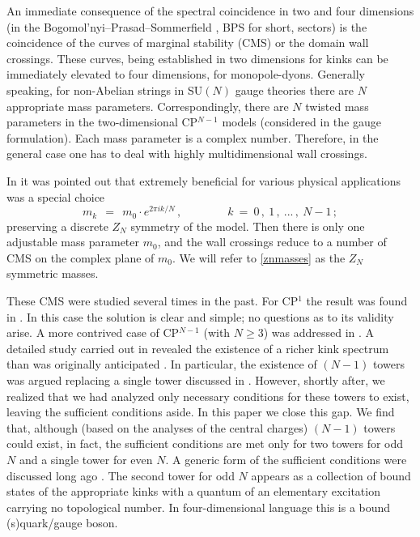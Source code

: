 \documentclass[epsfig,12pt]{article}
\def\beq{\begin{equation}}
\def\eeq{\end{equation}}
\def\beq{\begin{equation}}
\def\eeq{\end{equation}}
\begin{document}
	An immediate consequence of the spectral coincidence in two and four dimensions 
	(in the Bogomol'nyi--Prasad--Sommerfield 
\cite{BPS}, 
	BPS for short, sectors) 
	is the coincidence of the curves of marginal stability (CMS) or the domain wall crossings.
	These curves, being established in two dimensions for kinks can be immediately elevated to four dimensions, for monopole-dyons. 
	Generally speaking, for non-Abelian strings in SU$(N)$ gauge theories there are $N$ appropriate mass parameters.
	Correspondingly, there are $N$ twisted mass parameters in the two-dimensional CP$^{N-1}$ models (considered in the gauge formulation). 
	Each mass parameter is a complex number. 
	Therefore, in the general case one has to deal with highly multidimensional 
	 wall crossings.

	In \cite{Gorsky} it was pointed out that extremely beneficial for various physical applications 
	was a special choice 
\beq
\label{znmasses}
	m_k ~~=~~ m_0 \cdot e^{2 \pi i k / N}\,,\qquad\qquad k~=~0\,,~1\,,~ ...\,,~ N-1\,;
\eeq
	preserving a discrete $Z_N$ symmetry of the model. 
	Then there is only one adjustable mass parameter $m_0$,
	and the  wall crossings reduce to a number of CMS on the complex plane of $m_0$.
	We will refer to \eqref{znmasses} as the $Z_N$ symmetric masses.

	These CMS were studied several times in the past. For CP$^1$ the result was found in \cite{SVZw}.
	In this case the solution is clear and simple; no questions as to its validity arise.
	A more contrived case of 
	CP$^{N-1}$ (with $N\geq 3$) was addressed in \cite{5,Bolokhov:2011mp}. 
	A detailed study carried out in \cite{Bolokhov:2011mp} revealed
	the existence of a richer kink spectrum than was originally anticipated \cite{Dorey:1998yh}. 
	In particular, the existence of $(N-1)$ towers was argued replacing  a single tower discussed in \cite{Dorey:1998yh}. 
	However, shortly after, we realized
	that we had analyzed only necessary conditions for these towers to exist, leaving the sufficient conditions aside.
	In this paper we close this gap. We find that, although (based on the analyses of the central charges) $(N-1)$ towers could exist, 
	in fact, the sufficient conditions are met only for two towers for odd $N$ and a single tower for even $N$. 
	A generic form of the sufficient conditions were discussed long ago \cite{Dorey:1999zk}.
	The second tower for odd $N$ appears as a collection of bound states of the appropriate kinks with a quantum of
	an elementary excitation carrying no topological number.  In four-dimensional language this is a bound (s)quark/gauge boson.
\end{document}
